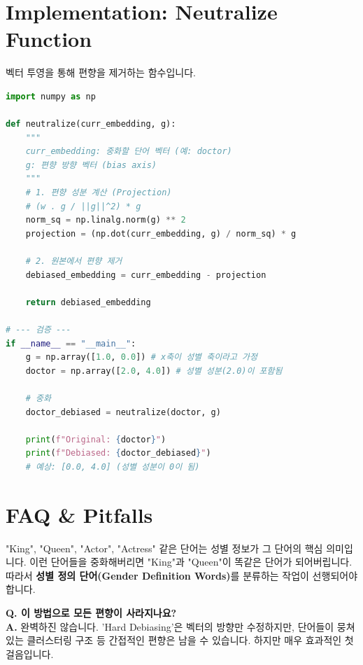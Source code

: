 \documentclass[11pt,a4paper]{book}
\theoremstyle{definition}
\begin{document}
\section{Implementation: Neutralize Function}

벡터 투영을 통해 편향을 제거하는 함수입니다.

\begin{lstlisting}[language=Python, caption=Neutralize Implementation, breaklines=true]
import numpy as np

def neutralize(curr_embedding, g):
    """
    curr_embedding: 중화할 단어 벡터 (예: doctor)
    g: 편향 방향 벡터 (bias axis)
    """
    # 1. 편향 성분 계산 (Projection)
    # (w . g / ||g||^2) * g
    norm_sq = np.linalg.norm(g) ** 2
    projection = (np.dot(curr_embedding, g) / norm_sq) * g
    
    # 2. 원본에서 편향 제거
    debiased_embedding = curr_embedding - projection
    
    return debiased_embedding

# --- 검증 ---
if __name__ == "__main__":
    g = np.array([1.0, 0.0]) # x축이 성별 축이라고 가정
    doctor = np.array([2.0, 4.0]) # 성별 성분(2.0)이 포함됨
    
    # 중화
    doctor_debiased = neutralize(doctor, g)
    
    print(f"Original: {doctor}")
    print(f"Debiased: {doctor_debiased}") 
    # 예상: [0.0, 4.0] (성별 성분이 0이 됨)
\end{lstlisting}

\section{FAQ \& Pitfalls}

\begin{warningbox}[title={모든 단어를 중화하면 안 됩니다!}]
"King", "Queen", "Actor", "Actress" 같은 단어는 성별 정보가 그 단어의 핵심 의미입니다. 이런 단어들을 중화해버리면 "King"과 "Queen"이 똑같은 단어가 되어버립니다.
따라서 \textbf{성별 정의 단어(Gender Definition Words)}를 분류하는 작업이 선행되어야 합니다.
\end{warningbox}

\textbf{Q. 이 방법으로 모든 편향이 사라지나요?} \\
\textbf{A.} 완벽하진 않습니다. 'Hard Debiasing'은 벡터의 방향만 수정하지만, 단어들이 뭉쳐 있는 클러스터링 구조 등 간접적인 편향은 남을 수 있습니다. 하지만 매우 효과적인 첫걸음입니다.

\end{document}
